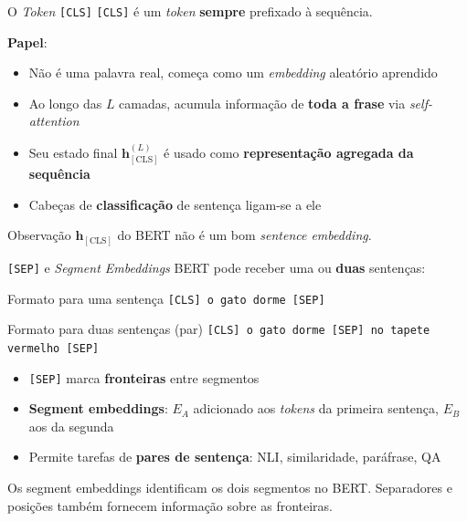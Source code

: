 \documentclass[aspectratio=169, xcolor=dvipsnames]{beamer}
\begin{document}
  \begin{frame}{O \textit{Token} \texttt{[CLS]}}
        \texttt{[CLS]} é um \textit{token} \textbf{sempre} prefixado à sequência.

        \vspace{0.4em}
        \textbf{Papel}:
        \begin{itemize}
          \item Não é uma palavra real, começa como um \textit{embedding} aleatório aprendido
          \item Ao longo das $L$ camadas, acumula informação de \textbf{toda a frase} via \textit{self-attention}
          \item Seu estado final $\mathbf{h}_{[\text{CLS}]}^{(L)}$ é usado como \textbf{representação agregada da sequência}
          \item Cabeças de \textbf{classificação} de sentença ligam-se a ele
        \end{itemize}
        \begin{alertblock}{Observação}
          $\mathbf{h}_{[\text{CLS}]}$ do BERT não é um bom \textit{sentence embedding}.
        \end{alertblock}
  \end{frame}

  \begin{frame}{\texttt{[SEP]} e \textit{Segment Embeddings}}
    BERT pode receber uma ou \textbf{duas} sentenças:
    \vspace{0.3em}
    \begin{block}{Formato para uma sentença}
      \texttt{[CLS] o gato dorme [SEP]}
    \end{block}
    \begin{block}{Formato para duas sentenças (par)}
      \texttt{[CLS] o gato dorme [SEP] no tapete vermelho [SEP]}
    \end{block}
    \vspace{0.3em}
    \begin{itemize}
      \item \texttt{[SEP]} marca \textbf{fronteiras} entre segmentos
      \item \textbf{Segment embeddings}: $E_A$ adicionado aos \textit{tokens} da primeira sentença, $E_B$ aos da segunda
      \item Permite tarefas de \textbf{pares de sentença}: NLI, similaridade, paráfrase, QA
    \end{itemize}
    \vspace{0.3em}
    Os segment embeddings identificam os dois segmentos no BERT.
    Separadores e posições também fornecem informação sobre as fronteiras.
  \end{frame}
\end{document}
